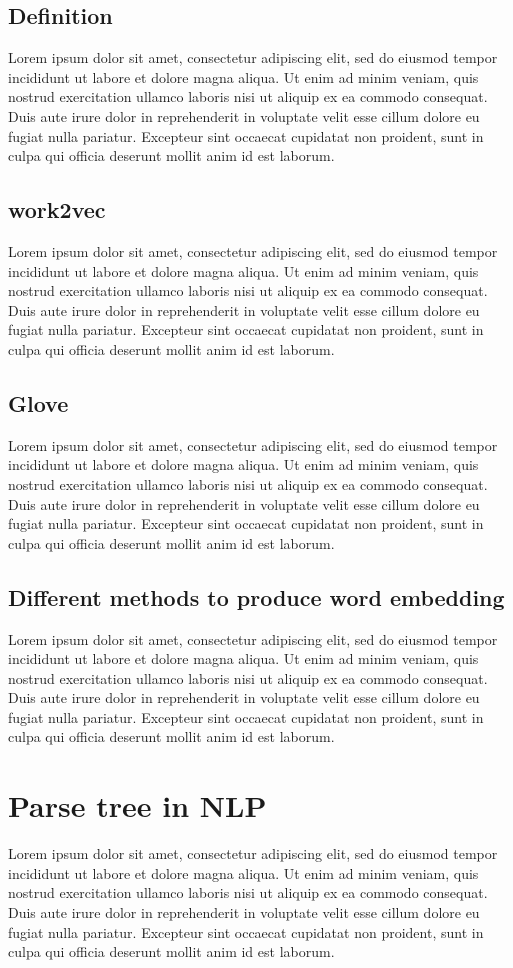 \subsection{Definition}
Lorem ipsum dolor sit amet, consectetur adipiscing elit, sed do eiusmod tempor incididunt ut labore et dolore magna aliqua. Ut enim ad minim veniam, quis nostrud exercitation ullamco laboris nisi ut aliquip ex ea commodo consequat. Duis aute irure dolor in reprehenderit in voluptate velit esse cillum dolore eu fugiat nulla pariatur. Excepteur sint occaecat cupidatat non proident, sunt in culpa qui officia deserunt mollit anim id est laborum.
\subsection{work2vec}
Lorem ipsum dolor sit amet, consectetur adipiscing elit, sed do eiusmod tempor incididunt ut labore et dolore magna aliqua. Ut enim ad minim veniam, quis nostrud exercitation ullamco laboris nisi ut aliquip ex ea commodo consequat. Duis aute irure dolor in reprehenderit in voluptate velit esse cillum dolore eu fugiat nulla pariatur. Excepteur sint occaecat cupidatat non proident, sunt in culpa qui officia deserunt mollit anim id est laborum.
\subsection{Glove}
Lorem ipsum dolor sit amet, consectetur adipiscing elit, sed do eiusmod tempor incididunt ut labore et dolore magna aliqua. Ut enim ad minim veniam, quis nostrud exercitation ullamco laboris nisi ut aliquip ex ea commodo consequat. Duis aute irure dolor in reprehenderit in voluptate velit esse cillum dolore eu fugiat nulla pariatur. Excepteur sint occaecat cupidatat non proident, sunt in culpa qui officia deserunt mollit anim id est laborum.
\subsection{Different methods to produce word embedding}
Lorem ipsum dolor sit amet, consectetur adipiscing elit, sed do eiusmod tempor incididunt ut labore et dolore magna aliqua. Ut enim ad minim veniam, quis nostrud exercitation ullamco laboris nisi ut aliquip ex ea commodo consequat. Duis aute irure dolor in reprehenderit in voluptate velit esse cillum dolore eu fugiat nulla pariatur. Excepteur sint occaecat cupidatat non proident, sunt in culpa qui officia deserunt mollit anim id est laborum.
\section{Parse tree in NLP}
Lorem ipsum dolor sit amet, consectetur adipiscing elit, sed do eiusmod tempor incididunt ut labore et dolore magna aliqua. Ut enim ad minim veniam, quis nostrud exercitation ullamco laboris nisi ut aliquip ex ea commodo consequat. Duis aute irure dolor in reprehenderit in voluptate velit esse cillum dolore eu fugiat nulla pariatur. Excepteur sint occaecat cupidatat non proident, sunt in culpa qui officia deserunt mollit anim id est laborum.
